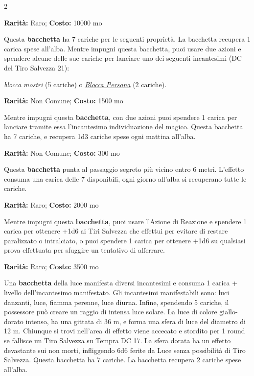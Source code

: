 \begin{multicols}{2}

\textbf{Rarità:} Raro; \textbf{Costo:} 10000 mo

Questa \textbf{bacchetta} ha 7 cariche per le seguenti proprietà. La bacchetta recupera 1 carica spese all'alba. Mentre impugni questa bacchetta, puoi usare due azioni e spendere alcune delle sue cariche per lanciare uno dei seguenti incantesimi (DC del Tiro Salvezza 21):

\emph{blocca mostri} (5 cariche) o \emph{\hyperlink{Blocca Persona}{Blocca Persona}} (2 cariche).


\textbf{Rarità:} Non Comune; \textbf{Costo:} 1500 mo

Mentre impugni questa \textbf{bacchetta}, con due azioni puoi spendere 1 carica per lanciare tramite essa l'incantesimo individuazione del magico. Questa bacchetta ha 7 cariche, e recupera 1d3 cariche spese ogni mattina all'alba.


\textbf{Rarità:} Non Comune; \textbf{Costo:} 300 mo

Questa \textbf{bacchetta} punta al passaggio segreto più vicino entro 6 metri. L'effetto consuma una carica delle 7 disponibili, ogni giorno all'alba si recuperano tutte le cariche.


\textbf{Rarità:} Raro; \textbf{Costo:} 2000 mo

Mentre impugni questa \textbf{bacchetta}, puoi usare l'Azione di Reazione e spendere 1 carica per ottenere +1d6 ai Tiri Salvezza che effettui per evitare di restare paralizzato o intralciato, o puoi spendere 1 carica per ottenere +1d6 su qualsiasi prova effettuata per sfuggire un tentativo di afferrare.


\textbf{Rarità:} Raro; \textbf{Costo:} 3500 mo

Una \textbf{bacchetta} della luce manifesta diversi incantesimi e consuma 1 carica + livello dell'incantesimo manifestato. Gli incantesimi manifestabili sono: luci danzanti, luce, fiamma perenne, luce diurna. Infine, spendendo 5 cariche, il possessore può creare un raggio di intensa luce solare. La luce di colore giallo-dorato intenso, ha una gittata di 36 m, e forma una sfera di luce del diametro di 12 m. Chiunque si trovi nell'area di effetto viene accecato e stordito per 1 round se fallisce un Tiro Salvezza su Tempra DC 17. La sfera dorata ha un effetto devastante sui non morti, infliggendo 6d6 ferite da Luce senza possibilità di Tiro Salvezza. Questa bacchetta ha 7 cariche. La bacchetta recupera 2 cariche spese all'alba.


\end{multicols}
